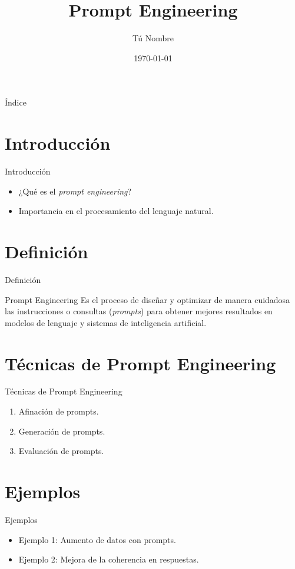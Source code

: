 \documentclass{beamer}
\title{Prompt Engineering}
\author{Tú Nombre}
\date{\today}
\begin{document}
\begin{frame}
  \titlepage
\end{frame}

\begin{frame}{Índice}
  \tableofcontents
\end{frame}

\section{Introducción}
\begin{frame}{Introducción}
  \begin{itemize}
    \item ¿Qué es el \textit{prompt engineering}?
    \item Importancia en el procesamiento del lenguaje natural.
  \end{itemize}
\end{frame}

\section{Definición}
\begin{frame}{Definición}
  \begin{block}{Prompt Engineering}
    Es el proceso de diseñar y optimizar de manera cuidadosa las instrucciones o consultas (\textit{prompts}) para obtener mejores resultados en modelos de lenguaje y sistemas de inteligencia artificial.
  \end{block}
\end{frame}

\section{Técnicas de Prompt Engineering}
\begin{frame}{Técnicas de Prompt Engineering}
  \begin{enumerate}
    \item Afinación de prompts.
    \item Generación de prompts.
    \item Evaluación de prompts.
  \end{enumerate}
\end{frame}

\section{Ejemplos}
\begin{frame}{Ejemplos}
  \begin{itemize}
    \item Ejemplo 1: Aumento de datos con prompts.
    \item Ejemplo 2: Mejora de la coherencia en respuestas.
  \end{itemize}
\end{frame}
\end{document}
